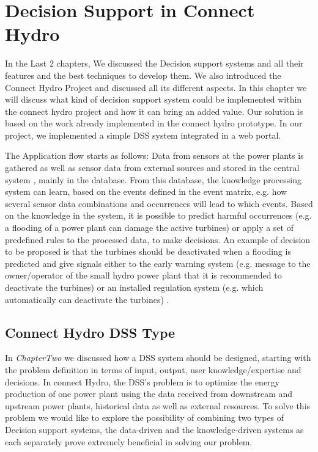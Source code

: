 \chapter{Decision Support in Connect Hydro}
\label{ChapterFour}
In the Last 2 chapters, We discussed the Decision support systems and all their features and the best techniques to develop them. We also introduced the Connect Hydro Project and discussed all its different aspects. In this chapter we will discuss what kind of decision support system could be implemented within the connect hydro project and how it can bring an added value. Our solution is based on the work already implemented in the connect hydro prototype. In our project, we implemented a simple DSS system integrated in a web portal.

The Application flow starts as follows: Data from sensors at the power plants is gathered as well as sensor data from external sources and stored in the central system , mainly in the database. From this database, the knowledge processing system can learn, based on the events defined in the event matrix, e.g. how several sensor data combinations and occurrences will lead to which events. Based on the knowledge in the system, it is possible to predict harmful occurrences (e.g. a flooding of a power plant can damage the active turbines) or apply a set of predefined rules to the processed data, to make decisions. An example of decision to be proposed is that the turbines should be deactivated when a flooding is predicted and give signals either to the early warning system (e.g. message to the owner/operator of the small hydro power plant that it is recommended to deactivate the turbines) or an installed regulation system (e.g. which automatically can deactivate the turbines) \cite{SEIT2017}.

\section{Connect Hydro DSS Type}
In \textit{ChapterTwo} we discussed how a DSS system should be designed, starting with the problem definition in terms of input, output, user knowledge/expertise and decisions. In connect Hydro, the DSS's problem is to optimize the energy production of one power plant using the data received from downstream and upstream power plants, historical data as well as external resources. To solve this problem we would like to explore the possibility of combining two types of Decision support systems, the data-driven and the knowledge-driven systems as each separately prove extremely beneficial in solving our problem.

